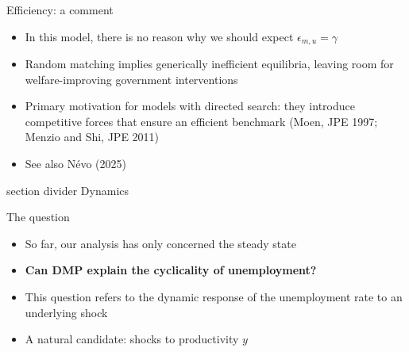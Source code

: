 \documentclass[9pt]{beamer}
\newcommand{\sectiondivider}[1]{
	\begin{frame}[plain]
		\vfill
		\begin{beamercolorbox}[wd=.84\textwidth,sep=1.1em,center,rounded=true]{section divider}
			{\usebeamerfont{section title} #1}
		\end{beamercolorbox}
		\vfill
	\end{frame}
}
\newcommand{\bit}{\begin{itemize}}
\newcommand{\eit}{\end{itemize}}
\newcommand{\bc}{\color{blue}}
\begin{document}
\begin{frame}{Efficiency: a comment}

\bit
\setlength\itemsep{1.5em}

\item In this model, there is no reason why we should expect $\epsilon_{m,u} = \gamma$

\item Random matching implies generically inefficient equilibria, leaving room for welfare-improving government interventions

\item Primary motivation for models with {\bc directed search}: they introduce competitive forces that ensure an efficient benchmark (Moen, JPE 1997; Menzio and Shi, JPE 2011)

\item See also Névo (2025)

\eit
\end{frame}

\sectiondivider{Dynamics}




\begin{frame}{The question}

\bit
\setlength\itemsep{2em}

\item So far, our analysis has only concerned the steady state

\item \bf Can DMP explain the cyclicality of unemployment? \normalfont

\item This question refers to the dynamic response of the unemployment rate to an underlying shock

\item A natural candidate: shocks to {\bc productivity $y$}



\eit
\end{frame}
\end{document}
